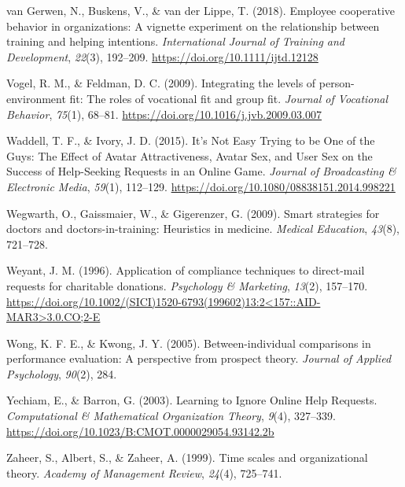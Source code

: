 \documentclass[english,,man]{apa6}
\begin{document}
\leavevmode\hypertarget{ref-van_gerwen_employee_2018}{}%
van Gerwen, N., Buskens, V., \& van der Lippe, T. (2018). Employee cooperative behavior in organizations: A vignette experiment on the relationship between training and helping intentions. \emph{International Journal of Training and Development}, \emph{22}(3), 192--209. \url{https://doi.org/10.1111/ijtd.12128}

\leavevmode\hypertarget{ref-vogel_integrating_2009}{}%
Vogel, R. M., \& Feldman, D. C. (2009). Integrating the levels of person-environment fit: The roles of vocational fit and group fit. \emph{Journal of Vocational Behavior}, \emph{75}(1), 68--81. \url{https://doi.org/10.1016/j.jvb.2009.03.007}

\leavevmode\hypertarget{ref-waddell_its_2015}{}%
Waddell, T. F., \& Ivory, J. D. (2015). It's Not Easy Trying to be One of the Guys: The Effect of Avatar Attractiveness, Avatar Sex, and User Sex on the Success of Help-Seeking Requests in an Online Game. \emph{Journal of Broadcasting \& Electronic Media}, \emph{59}(1), 112--129. \url{https://doi.org/10.1080/08838151.2014.998221}

\leavevmode\hypertarget{ref-wegwarth_smart_2009}{}%
Wegwarth, O., Gaissmaier, W., \& Gigerenzer, G. (2009). Smart strategies for doctors and doctors-in-training: Heuristics in medicine. \emph{Medical Education}, \emph{43}(8), 721--728.

\leavevmode\hypertarget{ref-weyant_application_1996}{}%
Weyant, J. M. (1996). Application of compliance techniques to direct-mail requests for charitable donations. \emph{Psychology \& Marketing}, \emph{13}(2), 157--170. \href{https://doi.org/10.1002/(SICI)1520-6793(199602)13:2\%3C157::AID-MAR3\%3E3.0.CO;2-E}{https://doi.org/10.1002/(SICI)1520-6793(199602)13:2\textless{}157::AID-MAR3\textgreater{}3.0.CO;2-E}

\leavevmode\hypertarget{ref-wong_between-individual_2005}{}%
Wong, K. F. E., \& Kwong, J. Y. (2005). Between-individual comparisons in performance evaluation: A perspective from prospect theory. \emph{Journal of Applied Psychology}, \emph{90}(2), 284.

\leavevmode\hypertarget{ref-yechiam_learning_2003}{}%
Yechiam, E., \& Barron, G. (2003). Learning to Ignore Online Help Requests. \emph{Computational \& Mathematical Organization Theory}, \emph{9}(4), 327--339. \url{https://doi.org/10.1023/B:CMOT.0000029054.93142.2b}

\leavevmode\hypertarget{ref-zaheer_time_1999}{}%
Zaheer, S., Albert, S., \& Zaheer, A. (1999). Time scales and organizational theory. \emph{Academy of Management Review}, \emph{24}(4), 725--741.
\end{document}

